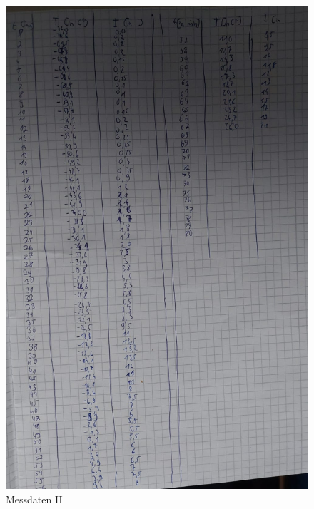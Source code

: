 \begin{figure}[h!]
  \centering
  \includegraphics[scale=0.3]{fig/mess2.jpeg}
  \caption{Messdaten II}
  \label{abb:mess2}
\end{figure}

